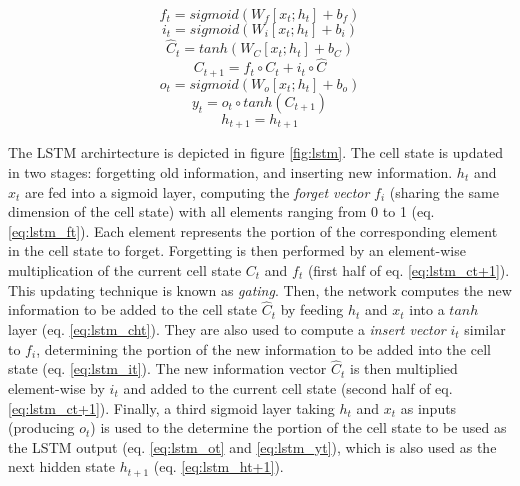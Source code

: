 \begin{equation}
   f_t = sigmoid(W_f[x_t;h_t] + b_f) 
   \label{eq:lstm_ft}
\end{equation}
\begin{equation}
   i_t = sigmoid(W_i[x_t;h_t] + b_i)
   \label{eq:lstm_it}
\end{equation}
\begin{equation}
   \hat{C}_t = tanh(W_C[x_t;h_t] + b_C)
   \label{eq:lstm_cht}
\end{equation}
\begin{equation}
   C_{t + 1} = f_t \circ C_t + i_t \circ \hat{C}
   \label{eq:lstm_ct+1}
\end{equation}
\begin{equation}
   o_t = sigmoid(W_o[x_t;h_t] + b_o)
   \label{eq:lstm_ot}
\end{equation}
\begin{equation}
   y_t = o_t \circ tanh(C_{t + 1})
   \label{eq:lstm_yt}
\end{equation}
\begin{equation}
   h_{t + 1} = h_{t + 1}
   \label{eq:lstm_ht+1}
\end{equation}

The LSTM archirtecture is depicted in figure \ref{fig:lstm}. The cell state is updated in two stages: forgetting old information, and inserting new information. $h_t$ and $x_t$ are fed into a sigmoid layer, computing the \emph{forget vector} $f_i$ (sharing the same dimension of the cell state) with all elements ranging from 0 to 1 (eq. \ref{eq:lstm_ft}). Each element represents the portion of the corresponding element in the cell state to forget. Forgetting is then performed by an element-wise multiplication of the current cell state $C_t$ and $f_t$ (first half of eq. \ref{eq:lstm_ct+1}). This updating technique is known as \emph{gating}. 
Then, the network computes the new information to be added to the cell state $\hat{C}_t$ by feeding $h_t$ and $x_t$ into a $tanh$ layer (eq. \ref{eq:lstm_cht}). They are also used to compute a \emph{insert vector} $i_t$ similar to $f_i$, determining the portion of the new information to be added into the cell state (eq. \ref{eq:lstm_it}). The new information vector $\hat{C}_t$ is then multiplied element-wise by $i_t$ and added to the current cell state (second half of eq. \ref{eq:lstm_ct+1}).
Finally, a third sigmoid layer taking $h_t$ and $x_t$ as inputs (producing $o_t$) is used to the determine the portion of the cell state to be used as the LSTM output (eq. \ref{eq:lstm_ot} and \ref{eq:lstm_yt}), which is also used as the next hidden state $h_{t+1}$ (eq. \ref{eq:lstm_ht+1}). 

